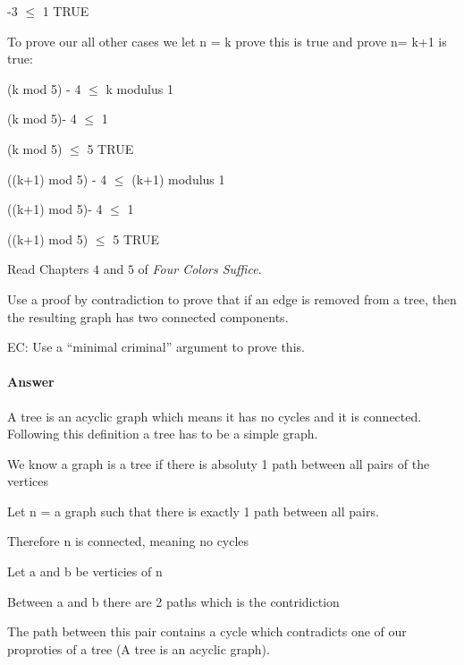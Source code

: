 \documentclass{article}
\begin{document}
{{-3 $\le $ 1}
{TRUE}


{To prove our all other cases we let n = k prove this is true and prove n= k+1 is true:  }

{(k mod 5) - 4 $\le $ k modulus 1}

{(k mod 5)- 4 $\le $ 1}

{(k mod 5) $\le $ 5}
{TRUE}


{((k+1) mod 5) - 4 $\le $ (k+1) modulus 1}

{((k+1) mod 5)- 4 $\le $ 1}

{((k+1) mod 5) $\le $ 5}
{TRUE}

 

Read Chapters $4$ and $5$ of \emph{Four Colors Suffice}.

Use a proof by contradiction to prove that if an edge is removed from a
tree, then the resulting graph has two connected components.

EC:
Use a ``minimal criminal'' argument to prove this.

        \paragraph{Answer}

{A tree is an acyclic graph which means it has no cycles and it is connected. Following this definition a tree has to be a simple graph.}

{We know a graph is a tree if there is absoluty 1 path between all pairs of the vertices}

{Let n = a graph such that there is exactly 1 path between all pairs.}

{Therefore n is connected, meaning no cycles}


{Let a and b be verticies of n}

{Between a and b there are 2 paths which is the contridiction}

{The path between this pair contains a cycle which contradicts one of our proproties of a tree (A tree is an acyclic graph).



}}
\end{document}
